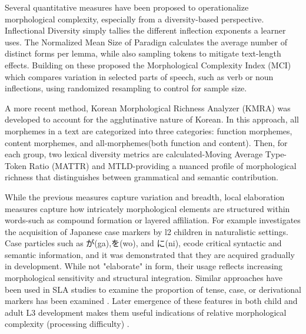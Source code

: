 Several quantitative measures have been proposed to operationalize morphological complexity, especially
from a diversity-based perspective. Inflectional Diversity
\citep{Malvern2004} simply tallies the
different inflection exponents a learner uses. The Normalized Mean Size of Paradign \citep{Xanthos2010} calculates
the average number of distinct forms per lemma, while also sampling tokens to mitigate text-length effects. Building
on these \cite{Brezina2019} proposed the Morphological Complexity Index (MCI) which compares variation in selected
parts of
speech, such as verb or noun
inflections, using
randomized resampling to control for sample size.

A more recent method, Korean Morphological Richness Analyzer (KMRA)
\citep{Hwang2024} was developed to account for the agglutinative nature of Korean. In this approach, all morphemes in
a text are categorized into three categories: function morphemes, content morphemes, and all-morphemes(both function
and content).
Then, for
each group, two lexical diversity metrics are calculated-Moving Average Type-Token Ratio (MATTR)\citep{Covington2010} and MTLD\citep{McCarthy2010}-providing
a nuanced profile of morphological richness that distinguishes between grammatical and semantic contribution.

While the previous measures capture variation and breadth, local elaboration measures capture how intricately
morphological elements are structured within words-such as compound formation or layered
affiliation. For example \cite{Nishikawa2023} investigates the acquisition of Japanese case markers by l2 children
in naturalistic settings. Case particles such as が(ga),を(wo), and に(ni), ecode critical syntactic and semantic
information, and it was demonstrated that they are acquired gradually in development. While not "elaborate" in form,
their usage reflects increasing morphological sensitivity and structural integration. Similar approaches have been
used in SLA studies to examine the proportion of tense, case, or derivational markers has been
examined
\citep{Verspoor2012,Guo2013, reynolds2016-insights,DeClercq2019}. Later emergence of these features in both child
and adult L3 development makes them useful indications of relative morphological complexity (processing difficulty)
\citep{Butle2012}.

